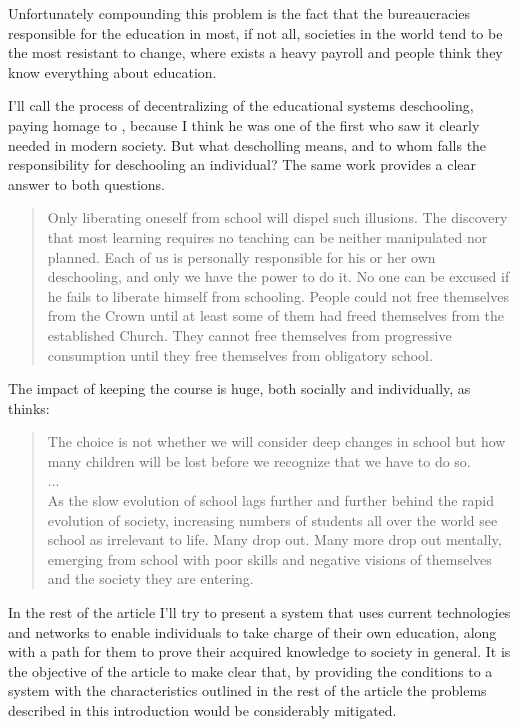 Unfortunately compounding this problem is the fact that the bureaucracies
responsible for the education in most, if not all, societies in the world tend
to be the most resistant to change, where exists a heavy payroll and people
think they know everything about education. \cite{education:negroponte_speech_ted}

I'll call the process of decentralizing of the educational systems deschooling,
paying homage to \cite{education:ivan_illich__deschooling_society}, because I
think he was one of the first who saw it clearly needed in modern society.  But
what descholling means, and to whom falls the responsibility for deschooling an
individual? The same work provides a clear answer to both questions.

\begin{quotation}
    Only liberating oneself from school will dispel such illusions. The discovery
    that most learning requires no teaching can be neither manipulated nor planned.
    Each of us is personally responsible for his or her own deschooling, and only we
    have the power to do it. No one can be excused if he fails to liberate himself
    from schooling. People could not free themselves from the Crown until at least
    some of them had freed themselves from the established Church. They cannot free
    themselves from progressive consumption until they free themselves from
    obligatory school.
\end{quotation}

The impact of keeping the course is huge, both socially and individually, as
\cite{education:papert_gaston_vision_for_education} thinks: 

\begin{quotation} 
    The choice is not whether we will consider deep changes in school but how many
    children will be lost before we recognize that we have to do so.
\\
...
\\
    As the slow evolution of school lags further and further behind the rapid
    evolution of society, increasing numbers of students all over the world see
    school as irrelevant to life. Many drop out. Many more drop out mentally,
    emerging from school with poor skills and negative visions of themselves and the
    society they are entering.
\end{quotation}

In the rest of the article I'll try to present a system that uses current
technologies and networks to enable individuals to take charge of their own
education, along with a path for them to prove their acquired knowledge to society
in general. It is the objective of the article to make clear that, by providing
the conditions to a system with the characteristics outlined in the rest of the
article the problems described in this introduction would be considerably
mitigated.

